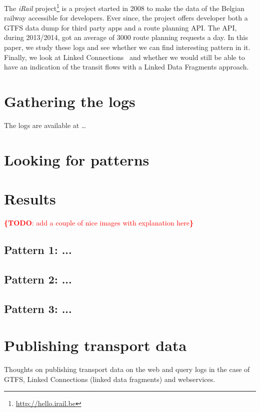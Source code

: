 \documentclass{sig-alternate}
\newcommand{\todo}[1]{\noindent\textcolor{red}{{\bf \{TODO}: #1{\bf \}}}}
\begin{document}

The \emph{iRail} project\footnote{\url{http://hello.irail.be}} is a project started in 2008 to make the data of the Belgian railway accessible for developers.
Ever since, the project offers developer both a GTFS data dump for third party apps and a route planning API.
The API, during 2013/2014, got an average of 3000 route planning requests a day.
In this paper, we study these logs and see whether we can find interesting pattern in it.
Finally, we look at Linked Connections~\cite{lc} and whether we would still be able to have an indication of the transit flows with a Linked Data Fragments approach.

\section{Gathering the logs}
\label{sec:logs}

The logs are available at \ldots

\section{Looking for patterns}
\label{sec:method}


\section{Results}
\label{sec:results}

\todo{add a couple of nice images with explanation here}

\subsection{Pattern 1: ...}
\label{sec:pattern1}

\subsection{Pattern 2: ...}
\label{sec:pattern2}

\subsection{Pattern 3: ...}
\label{sec:pattern3}

\section{Publishing transport data}

Thoughts on publishing transport data on the web and query logs in the case of GTFS, Linked Connections\cite{lc} (linked data fragments\cite{ldf}) and webservices.
\end{document}

